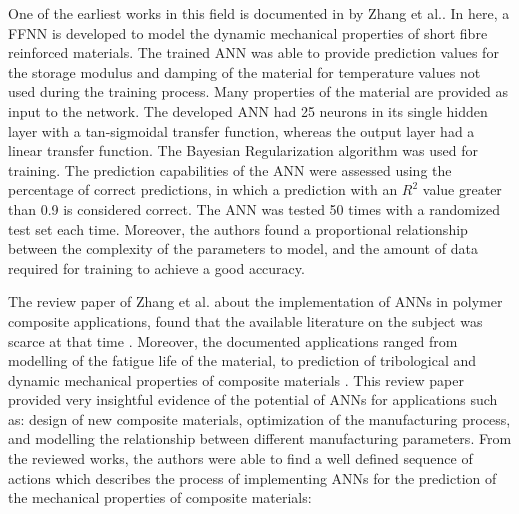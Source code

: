 One of the earliest works in this field is documented in \cite{zhang2002dynamic} by Zhang et al.. In here, a FFNN is developed to model the dynamic mechanical properties of short fibre reinforced materials. The trained ANN was able to provide prediction values for the storage modulus and damping of the material for temperature values not used during the training process. Many properties of the material are provided as input to the network. The developed ANN had 25 neurons in its single hidden layer with a tan-sigmoidal transfer function, whereas the output layer had a linear transfer function. The Bayesian Regularization algorithm was used for training. The prediction capabilities of the ANN were assessed using the percentage of correct predictions, in which a prediction with an $R^2$ value greater than 0.9 is considered correct. The ANN was tested 50 times with a randomized test set each time. Moreover, the authors found a proportional relationship between the complexity of the parameters to model, and the amount of data required for training to achieve a good accuracy.

The review paper of Zhang et al. about the implementation of ANNs in polymer composite applications, found that the available literature on the subject was scarce at that time \cite{zhang2003artificial}. Moreover, the documented applications ranged from modelling of the fatigue life of the material, to prediction of tribological and dynamic mechanical properties of composite materials \cite{zhang2002prediction,zhang2002dynamic}. This review paper provided very insightful evidence of the potential of ANNs for applications such as: design of new composite materials, optimization of the manufacturing process, and modelling the relationship between different manufacturing parameters. From the reviewed works, the authors were able to find a well defined sequence of actions which describes the process of implementing ANNs for the prediction of the mechanical properties of composite materials:


